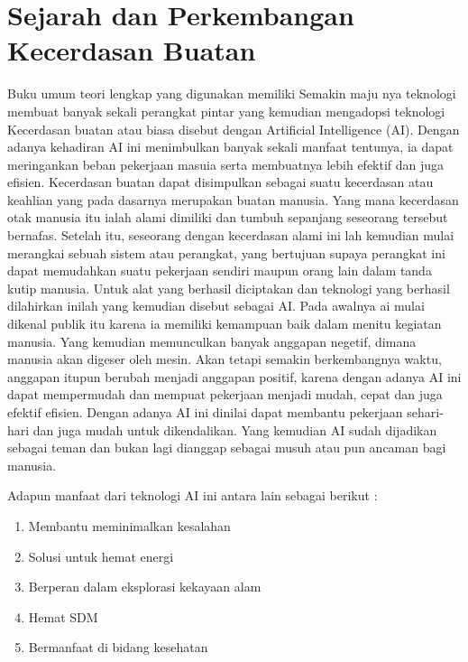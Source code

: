 \chapter{Sejarah dan Perkembangan Kecerdasan Buatan}
Buku umum teori lengkap yang digunakan memiliki Semakin maju nya teknologi membuat banyak sekali perangkat pintar yang kemudian mengadopsi teknologi Kecerdasan buatan atau biasa disebut dengan Artificial Intelligence (AI). Dengan adanya kehadiran AI ini menimbulkan banyak sekali manfaat tentunya, ia dapat meringankan beban pekerjaan masuia serta membuatnya lebih efektif dan juga efisien. Kecerdasan buatan dapat disimpulkan sebagai suatu kecerdasan atau keahlian yang pada dasarnya merupakan buatan manusia. Yang mana kecerdasan otak manusia itu ialah alami dimiliki dan tumbuh sepanjang seseorang tersebut bernafas. Setelah itu, seseorang dengan kecerdasan alami ini lah kemudian mulai merangkai sebuah sistem atau perangkat, yang bertujuan supaya perangkat ini dapat memudahkan suatu pekerjaan sendiri maupun orang lain dalam tanda kutip manusia. Untuk alat yang berhasil diciptakan dan teknologi yang berhasil dilahirkan inilah yang kemudian disebut sebagai AI.
Pada awalnya ai mulai dikenal publik itu karena ia memiliki kemampuan baik dalam menitu kegiatan manusia. Yang kemudian memunculkan banyak anggapan negetif, dimana manusia akan digeser oleh mesin. Akan tetapi semakin berkembangnya waktu, anggapan itupun berubah menjadi anggapan positif, karena dengan adanya AI ini dapat mempermudah dan mempuat pekerjaan menjadi mudah, cepat dan juga efektif efisien. Dengan adanya AI ini  dinilai dapat membantu pekerjaan sehari-hari dan juga mudah untuk dikendalikan. Yang kemudian AI sudah dijadikan sebagai teman dan bukan lagi dianggap sebagai musuh atau pun ancaman bagi manusia.


Adapun manfaat dari teknologi AI ini antara lain sebagai berikut :
\begin{enumerate}
	\item
	      Membantu meminimalkan kesalahan
	\item
	      Solusi untuk hemat energi
	\item
	      Berperan dalam eksplorasi kekayaan alam
	\item
	      Hemat SDM
	\item
	      Bermanfaat di bidang kesehatan
\end{enumerate}

